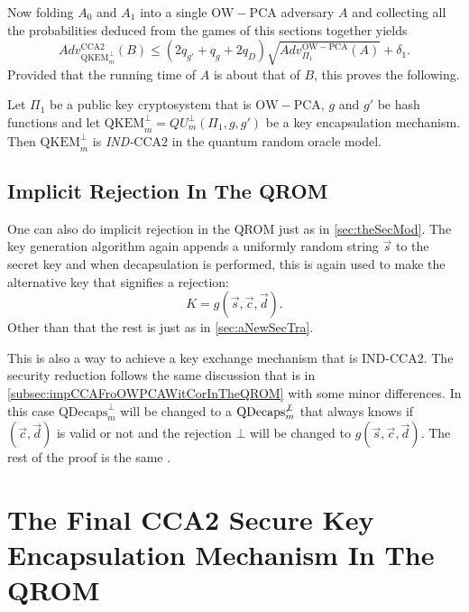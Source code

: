 Now folding $A_0$ and $A_1$ into a single $\mathrm{OW-PCA}$ adversary $A$ and collecting all the probabilities deduced from the games of this sections together yields
\begin{equation}
\label{eq:boundForBInTheQROM}
	Adv_{\mathrm{QKEM}^{\bot}_m}^{\mathrm{CCA}2}\left(B\right) \leq \left( 2 q_{g'} + q_g + 2 q_D \right) \sqrt{Adv_{\Pi_1}^{\mathrm{OW-PCA}}\left(A\right)} + \delta_1.
\end{equation}
Provided that the running time of $A$ is about that of $B$, this proves the following.
\begin{thm}
\label{thm:QROMTrans}
	Let $\Pi_1$ be a public key cryptosystem that is $\mathrm{OW-PCA}$, $g$ and $g'$ be hash functions and let $\mathrm{QKEM}^{\bot}_m = QU^{\bot}_m \left( \Pi_1, g, g' \right)$ be a key encapsulation mechanism. Then $\mathrm{QKEM}^{\bot}_m$ is \emph{IND-}$\mathrm{CCA}2$ in the quantum random oracle model.
\end{thm}



\subsection{Implicit Rejection In The QROM}

One can also do implicit rejection in the QROM just as in \cref{sec:theSecMod}. The key generation algorithm again appends a uniformly random string $\vec{s}$ to the secret key and when decapsulation is performed, this is again used to make the alternative key that signifies a rejection:
\[
	K = g\left( \vec{s}, \vec{c}, \vec{d} \right).
\]
Other than that the rest is just as in \cref{sec:aNewSecTra}.

This is also a way to achieve a key exchange mechanism that is IND-$\mathrm{CCA}2$. The security reduction follows the same discussion that is in \cref{subsec:impCCAFroOWPCAWitCorInTheQROM} with some minor differences. In this case $\mathrm{QDecaps}^{\bot}_m$ will be changed to a $\mathrm{QDecaps}^{\not\bot}_m$ that always knows if $\left( \vec{c}, \vec{d} \right)$ is valid or not and the rejection $\bot$ will be changed to $g\left( \vec{s}, \vec{c}, \vec{d} \right)$. The rest of the proof is the same \cite{HHK}.



\section{The Final CCA2 Secure Key Encapsulation Mechanism In The QROM}
\label{sec:theFinCCASecKeyEncMecInTheQRO}

